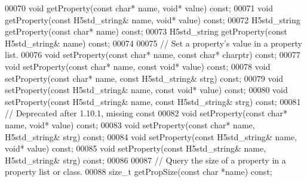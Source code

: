 \begin{DoxyCode}
00070         \textcolor{keywordtype}{void} getProperty(\textcolor{keyword}{const} \textcolor{keywordtype}{char}* name, \textcolor{keywordtype}{void}* value) \textcolor{keyword}{const};
00071         \textcolor{keywordtype}{void} getProperty(\textcolor{keyword}{const} H5std\_string& name, \textcolor{keywordtype}{void}* value) \textcolor{keyword}{const};
00072         H5std\_string getProperty(\textcolor{keyword}{const} \textcolor{keywordtype}{char}* name) \textcolor{keyword}{const};
00073         H5std\_string getProperty(\textcolor{keyword}{const} H5std\_string& name) \textcolor{keyword}{const};
00074 
00075         \textcolor{comment}{// Set a property's value in a property list.}
00076         \textcolor{keywordtype}{void} setProperty(\textcolor{keyword}{const} \textcolor{keywordtype}{char}* name, \textcolor{keyword}{const} \textcolor{keywordtype}{char}* charptr) \textcolor{keyword}{const};
00077         \textcolor{keywordtype}{void} setProperty(\textcolor{keyword}{const} \textcolor{keywordtype}{char}* name, \textcolor{keyword}{const} \textcolor{keywordtype}{void}* value) \textcolor{keyword}{const};
00078         \textcolor{keywordtype}{void} setProperty(\textcolor{keyword}{const} \textcolor{keywordtype}{char}* name, \textcolor{keyword}{const} H5std\_string& strg) \textcolor{keyword}{const};
00079         \textcolor{keywordtype}{void} setProperty(\textcolor{keyword}{const} H5std\_string& name, \textcolor{keyword}{const} \textcolor{keywordtype}{void}* value) \textcolor{keyword}{const};
00080         \textcolor{keywordtype}{void} setProperty(\textcolor{keyword}{const} H5std\_string& name, \textcolor{keyword}{const} H5std\_string& strg) \textcolor{keyword}{const};
00081         \textcolor{comment}{// Deprecated after 1.10.1, missing const}
00082         \textcolor{keywordtype}{void} setProperty(\textcolor{keyword}{const} \textcolor{keywordtype}{char}* name, \textcolor{keywordtype}{void}* value) \textcolor{keyword}{const};
00083         \textcolor{keywordtype}{void} setProperty(\textcolor{keyword}{const} \textcolor{keywordtype}{char}* name, H5std\_string& strg) \textcolor{keyword}{const};
00084         \textcolor{keywordtype}{void} setProperty(\textcolor{keyword}{const} H5std\_string& name, \textcolor{keywordtype}{void}* value) \textcolor{keyword}{const};
00085         \textcolor{keywordtype}{void} setProperty(\textcolor{keyword}{const} H5std\_string& name, H5std\_string& strg) \textcolor{keyword}{const};
00086 
00087         \textcolor{comment}{// Query the size of a property in a property list or class.}
00088         \textcolor{keywordtype}{size\_t} getPropSize(\textcolor{keyword}{const} \textcolor{keywordtype}{char} *name) \textcolor{keyword}{const};

\end{DoxyCode}
